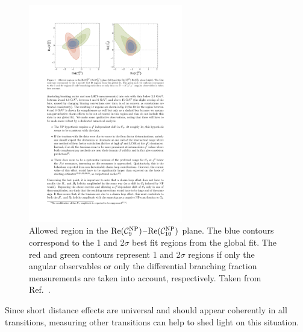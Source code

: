 \begin{figure}[!tb]
\centering
\includegraphics[trim={2.5cm 20cm 10.7cm 2.4cm},clip,width=0.6\textwidth]{figs/kpimm/introduction/c9c10.pdf}
\caption{Allowed region in the ${\rm Re}(\mathcal{C}_{9}^{\rm NP})$--${\rm Re}(\mathcal{C}_{10}^{\rm NP})$ plane. The blue contours correspond to the 1 and 2$\sigma$ best fit regions from the global fit. The red and green contours represent 1 and 2$\sigma$ regions if only the \BdToKstmmP angular observables or only the differential branching fraction measurements are taken into account, respectively. Taken from Ref.~\cite{straub}.}
\label{fig:kpimm:c9c10}
\end{figure}

Since short distance effects are universal and should appear coherently in all \btosmm transitions, measuring other \btosmm transitions can help to shed light on this situation.


